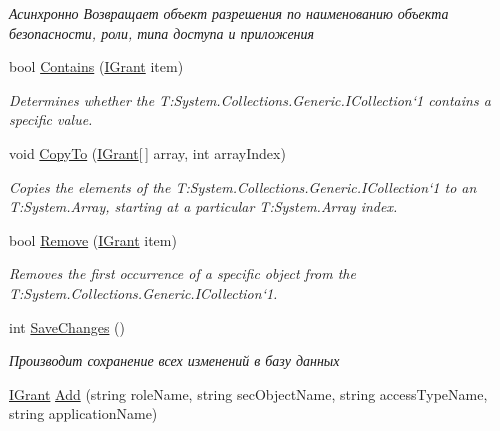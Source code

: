 \begin{DoxyCompactItemize}
\begin{DoxyCompactList}\small\item\em Асинхронно Возвращает объект разрешения по наименованию объекта безопасности, роли, типа доступа и приложения \end{DoxyCompactList}\item 
bool \hyperlink{class_security_1_1_entity_framework_1_1_collections_1_1_grant_collection_aa167ba66c0a65434f852eb11fbec7ec3}{Contains} (\hyperlink{interface_security_1_1_interfaces_1_1_model_1_1_i_grant}{I\+Grant} item)
\begin{DoxyCompactList}\small\item\em Determines whether the T\+:\+System.\+Collections.\+Generic.\+I\+Collection`1 contains a specific value. \end{DoxyCompactList}\item 
void \hyperlink{class_security_1_1_entity_framework_1_1_collections_1_1_grant_collection_acb9fb91aac8d155a18c407f8f14dd99d}{Copy\+To} (\hyperlink{interface_security_1_1_interfaces_1_1_model_1_1_i_grant}{I\+Grant}\mbox{[}$\,$\mbox{]} array, int array\+Index)
\begin{DoxyCompactList}\small\item\em Copies the elements of the T\+:\+System.\+Collections.\+Generic.\+I\+Collection`1 to an T\+:\+System.\+Array, starting at a particular T\+:\+System.\+Array index. \end{DoxyCompactList}\item 
bool \hyperlink{class_security_1_1_entity_framework_1_1_collections_1_1_grant_collection_a95e929659c16750c32fdd468d319f311}{Remove} (\hyperlink{interface_security_1_1_interfaces_1_1_model_1_1_i_grant}{I\+Grant} item)
\begin{DoxyCompactList}\small\item\em Removes the first occurrence of a specific object from the T\+:\+System.\+Collections.\+Generic.\+I\+Collection`1. \end{DoxyCompactList}\item 
int \hyperlink{class_security_1_1_entity_framework_1_1_collections_1_1_grant_collection_a54731a4ca3c561b54b788c834149392d}{Save\+Changes} ()
\begin{DoxyCompactList}\small\item\em Производит сохранение всех изменений в базу данных \end{DoxyCompactList}\item 
\hyperlink{interface_security_1_1_interfaces_1_1_model_1_1_i_grant}{I\+Grant} \hyperlink{class_security_1_1_entity_framework_1_1_collections_1_1_grant_collection_a7ebc4e3c1d4acadbf2ce58565888e7e4}{Add} (string role\+Name, string sec\+Object\+Name, string access\+Type\+Name, string application\+Name)

\end{DoxyCompactItemize}
